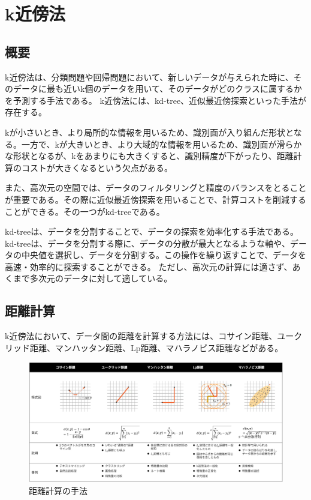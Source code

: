 \documentclass{ltjsarticle}
\begin{document}
\newpage

\section{k近傍法}
\subsection{概要}
k近傍法は、分類問題や回帰問題において、新しいデータが与えられた時に、そのデータに最も近いk個のデータを用いて、そのデータがどのクラスに属するかを予測する手法である。
k近傍法には、kd-tree、近似最近傍探索といった手法が存在する。
\par
kが小さいとき、より局所的な情報を用いるため、識別面が入り組んだ形状となる。一方で、kが大きいとき、より大域的な情報を用いるため、識別面が滑らかな形状となるが、kをあまりにも大きくすると、識別精度が下がったり、距離計算のコストが大きくなるという欠点がある。
\par
また、高次元の空間では、データのフィルタリングと精度のバランスをとることが重要である。その際に近似最近傍探索を用いることで、計算コストを削減することができる。その一つがkd-treeである。
\par
kd-treeは、データを分割することで、データの探索を効率化する手法である。kd-treeは、データを分割する際に、データの分散が最大となるような軸や、データの中央値を選択し、データを分割する。この操作を繰り返すことで、データを高速・効率的に探索することができる。
ただし、高次元の計算には適さず、あくまで多次元のデータに対して適している。

\subsection{距離計算}
k近傍法において、データ間の距離を計算する方法には、コサイン距離、ユークリッド距離、マンハッタン距離、Lp距離、マハラノビス距離などがある。
\begin{figure}[htbp]
  \centering
  \includegraphics[width=13cm]{capture/距離計算.png}
  \caption{距離計算の手法}
\end{figure}
\end{document}
